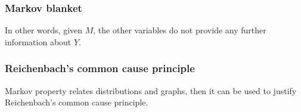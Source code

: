 \documentclass{beamer}
\begin{document}
\begin{frame}
    \frametitle{Markov blanket} 
    \begin{flushleft}
         In other words, given $M$, the other variables do not provide any further information about $Y$.
    \end{flushleft}
\end{frame}

\begin{frame}
    \frametitle{Reichenbach's common cause principle}
    \begin{flushleft}
        Markov property relates distributions and graphs, then it can be used to justify Reichenbach's common cause principle.  
    \end{flushleft}
\end{frame}

\end{document}
